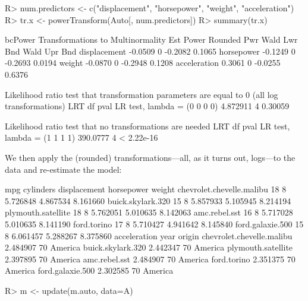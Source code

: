 \documentclass[
]{jss}
\begin{document}
\begin{CodeChunk}
\begin{CodeInput}
R> num.predictors <- c("displacement", "horsepower", "weight", "acceleration")
R> tr.x <- powerTransform(Auto[, num.predictors])
R> summary(tr.x)
\end{CodeInput}
\begin{CodeOutput}
bcPower Transformations to Multinormality 
             Est Power Rounded Pwr Wald Lwr Bnd Wald Upr Bnd
displacement   -0.0509           0      -0.2082       0.1065
horsepower     -0.1249           0      -0.2693       0.0194
weight         -0.0870           0      -0.2948       0.1208
acceleration    0.3061           0      -0.0255       0.6376

Likelihood ratio test that transformation parameters are equal to 0
 (all log transformations)
                                 LRT df    pval
LR test, lambda = (0 0 0 0) 4.872911  4 0.30059

Likelihood ratio test that no transformations are needed
                                 LRT df       pval
LR test, lambda = (1 1 1 1) 390.0777  4 < 2.22e-16
\end{CodeOutput}
\end{CodeChunk}

We then apply the (rounded) transformations---all, as it turns out,
logs---to the data and re-estimate the model:

\begin{CodeChunk}
\begin{CodeOutput}
                          mpg cylinders displacement horsepower   weight
chevrolet.chevelle.malibu  18         8     5.726848   4.867534 8.161660
buick.skylark.320          15         8     5.857933   5.105945 8.214194
plymouth.satellite         18         8     5.762051   5.010635 8.142063
amc.rebel.sst              16         8     5.717028   5.010635 8.141190
ford.torino                17         8     5.710427   4.941642 8.145840
ford.galaxie.500           15         8     6.061457   5.288267 8.375860
                          acceleration year  origin
chevrolet.chevelle.malibu     2.484907   70 America
buick.skylark.320             2.442347   70 America
plymouth.satellite            2.397895   70 America
amc.rebel.sst                 2.484907   70 America
ford.torino                   2.351375   70 America
ford.galaxie.500              2.302585   70 America
\end{CodeOutput}
\begin{CodeInput}
R> m <- update(m.auto, data=A)
\end{CodeInput}
\end{CodeChunk}
\end{document}
